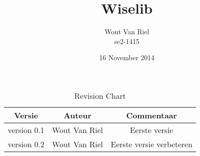\documentclass{article}
\begin{document}
\begin{titlepage}
\title{Wiselib}
\date{16 November 2014}
\author{Wout Van Riel \\ se2-1415}
\end{titlepage}

\maketitle

\newpage
\tableofcontents

\newpage

\begin{table}[h]
\centering
\begin{tabular}{c|c|c}
Versie & Auteur & Commentaar \\
\hline
 version 0.1 & Wout Van Riel & Eerste versie\\
 version 0.2 & Wout Van Riel & Eerste versie verbeteren\\

\end{tabular}

\caption{Revision Chart}
\label{tab:revchart}
\end{table}













\end{document}
